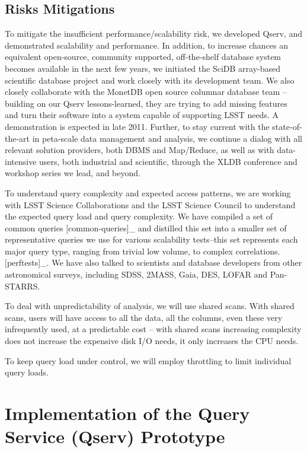 \documentclass[DM,lsstdraft,toc]{lsstdoc}
\begin{document}
\subsection{Risks Mitigations}\label{risks-mitigations}

To mitigate the insufficient performance/scalability risk, we developed
Qserv, and demonstrated scalability and performance. In addition, to
increase chances an equivalent open-source, community supported,
off-the-shelf database system becomes available in the next few years,
we initiated the SciDB array-based scientific database project and work
closely with its development team. We also closely collaborate with the
MonetDB open source columnar database team -- building on our Qserv
lessons-learned, they are trying to add missing features and turn their
software into a system capable of supporting LSST needs. A demonstration
is expected in late 2011. Further, to stay current with the
state-of-the-art in peta-scale data management and analysis, we continue
a dialog with all relevant solution providers, both DBMS and Map/Reduce,
as well as with data-intensive users, both industrial and scientific,
through the XLDB conference and workshop series
we lead, and beyond.

To understand query complexity and expected access patterns, we are
working with LSST Science Collaborations and the LSST Science Council to
understand the expected query load and query complexity. We have
compiled a set of common queries {[}common-queries{]}\_ and distilled
this set into a smaller set of representative queries we use for various
scalability tests--this set represents each major query type, ranging
from trivial low volume, to complex correlations. {[}perftests{]}\_. We
have also talked to scientists and database developers from other
astronomical surveys, including SDSS, 2MASS, Gaia, DES, LOFAR and
Pan-STARRS.

To deal with unpredictability of analysis, we will use shared scans.
With shared scans, users will have access to all the data, all the
columns, even these very infrequently used, at a predictable cost --
with shared scans increasing complexity does not increase the expensive
disk I/O needs, it only increases the CPU needs.

To keep query load under control, we will employ throttling to limit
individual query loads.

\section{Implementation of the Query Service (Qserv)
Prototype}\label{implementation}
\end{document}
